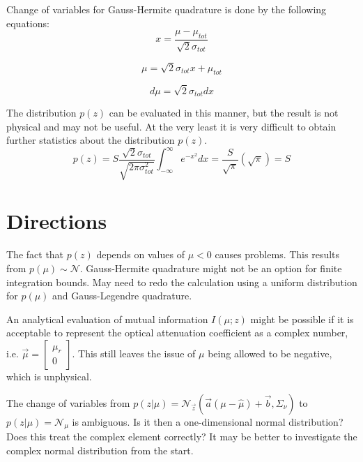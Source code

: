\documentclass{article}         %
\theoremstyle{definition}
\theoremstyle{remark}
\begin{document}
Change of variables for Gauss-Hermite quadrature is done by the following equations:
\begin{equation}
	x = \frac{\mu - \mu_{tot}}{\sqrt{2}\sigma_{tot}}
\end{equation}

\begin{equation}
	\mu = \sqrt{2}\sigma_{tot}x + \mu_{tot}
\end{equation}

\begin{equation}
	d\mu = \sqrt{2}\sigma_{tot}dx
\end{equation}

The distribution $p\left(z\right)$ can be evaluated in this manner, but the result is not physical and may not be useful. At the very least it is very difficult to obtain further statistics about the distribution $p\left(z\right)$.
\begin{equation}
	p\left(z\right) = S\frac{\sqrt{2}\sigma_{tot}}{\sqrt{2\pi\sigma_{tot}^2}}\int_{-\infty}^\infty e^{-x^2}dx = \frac{S}{\sqrt{\pi}}\left(\sqrt{\pi}\right) = S
\end{equation}

\section{Directions}\label{Directions}

The fact that $p\left(z\right)$ depends on values of $\mu < 0$ causes problems. This results from $p\left(\mu\right)\sim\mathcal{N}$. Gauss-Hermite quadrature might not be an option for finite integration bounds. May need to redo the calculation using a uniform distribution for $p\left(\mu\right)$ and Gauss-Legendre quadrature.

An analytical evaluation of mutual information $I\left(\mu;z\right)$ might be possible if it is acceptable to represent the optical attenuation coefficient as a complex number, i.e. $\vec{\mu} = \left[ \begin{array}{c} \mu_r \\ 0 \end{array} \right]$. This still leaves the issue of $\mu$ being allowed to be negative, which is unphysical.

The change of variables from $p\left(z|\mu\right) = \mathcal{N}_{\vec{z}}\left(\vec{a}\left(\mu-\hat{\mu}\right)+\vec{b},\Sigma_\nu\right)$ to $p\left(z|\mu\right) = \mathcal{N}_\mu$ is ambiguous. Is it then a one-dimensional normal distribution? Does this treat the complex element correctly? It may be better to investigate the complex normal distribution from the start.
\end{document}
